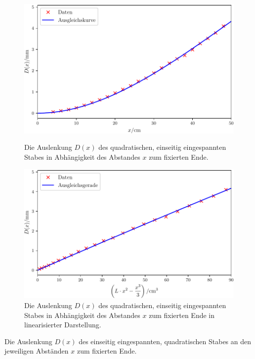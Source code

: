 \begin{figure}
	\centering
	\includegraphics[scale=.7]{content/images/StabQuadratEinseitig1.pdf}
	\caption{Die Auslenkung $D(x)$ des quadratischen, einseitig eingespannten Stabes in Abhängigkeit des Abstandes $x$ zum fixierten Ende.}
	\label{fig:quadratisch}
	\vspace{0.5cm}
	\centering
	\includegraphics[scale=.7]{content/images/StabQuadratEinseitig2.pdf}
	\caption{Die Auslenkung $D(x)$ des quadratischen, einseitig eingespannten Stabes in Abhängigkeit des Abstandes $x$ zum fixierten Ende in linearisierter Darstellung.}
	\label{fig:quadratischlinear}
\end{figure}

\begin{table}
	\caption{Die Auslenkung $D(x)$ des einseitig eingespannten, quadratischen Stabes an den jeweiligen Abständen $x$ zum fixierten Ende.}
	\begin{minipage}{0.5\textwidth}
		\centering
		
	\end{minipage}
	\begin{minipage}{0.5\textwidth}
		\centering
		
	\end{minipage}
\end{table}

